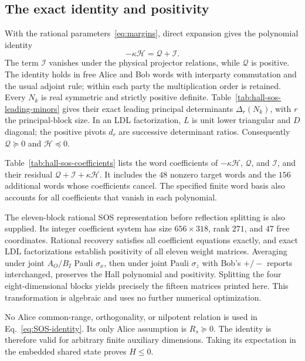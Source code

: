 \documentclass[11pt]{article}
\begin{document}
\subsection{The exact identity and positivity}
With the rational parameters~\eqref{eq:margins}, direct expansion gives the polynomial identity
\begin{equation}
 \boxed{-\kappa\mathcal H=\mathcal Q+\mathcal I.}
 \label{eq:SOS-identity}
\end{equation}
The term $\mathcal I$ vanishes under the physical projector relations, while $\mathcal Q$ is positive. The identity holds in free Alice and Bob words with interparty commutation and the usual adjoint rule; within each party the multiplication order is retained. Every $N_k$ is real symmetric and strictly positive definite. Table~\ref{tab:hall-sos-leading-minors} gives their exact leading principal determinants $\Delta_r(N_k)$, with $r$ the principal-block size. In an LDL factorization, $L$ is unit lower triangular and $D$ diagonal; the positive pivots $d_r$ are successive determinant ratios. Consequently $\mathcal Q\succeq0$ and $\mathcal H\preceq0$.


Table~\ref{tab:hall-sos-coefficients} lists the word coefficients of $-\kappa\mathcal H$, $\mathcal Q$, and $\mathcal I$, and their residual $\mathcal Q+\mathcal I+\kappa\mathcal H$. It includes the $48$ nonzero target words and the $156$ additional words whose coefficients cancel. The specified finite word basis also accounts for all coefficients that vanish in each polynomial.


The eleven-block rational SOS representation before reflection splitting is also supplied. Its integer coefficient system has size $656\times318$, rank $271$, and $47$ free coordinates. Rational recovery satisfies all coefficient equations exactly, and exact LDL factorizations establish positivity of all eleven weight matrices. Averaging under joint $A_O/B_I$ Pauli $\sigma_x$, then under joint Pauli $\sigma_z$ with Bob's $+/-$ reports interchanged, preserves the Hall polynomial and positivity. Splitting the four eight-dimensional blocks yields precisely the fifteen matrices printed here. This transformation is algebraic and uses no further numerical optimization.

No Alice common-range, orthogonality, or nilpotent relation is used in Eq.~\eqref{eq:SOS-identity}. Its only Alice assumption is $R_s\succeq0$. The identity is therefore valid for arbitrary finite auxiliary dimensions. Taking its expectation in the embedded shared state proves $H\le0$.
\end{document}
